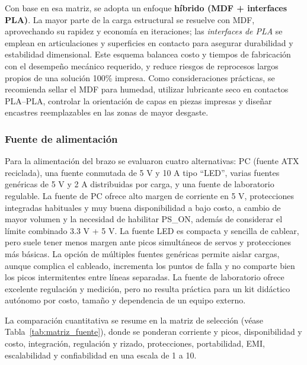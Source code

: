 Con base en esa matriz, se adopta un enfoque \textbf{híbrido (MDF + interfaces PLA)}. La mayor parte de la carga estructural se resuelve con MDF, aprovechando su rapidez y economía en iteraciones; las \emph{interfaces de PLA} se emplean en articulaciones y superficies en contacto para asegurar durabilidad y estabilidad dimensional. Este esquema balancea costo y tiempos de fabricación con el desempeño mecánico requerido, y reduce riesgos de reprocesos largos propios de una solución 100\% impresa. Como consideraciones prácticas, se recomienda sellar el MDF para humedad, utilizar lubricante seco en contactos PLA–PLA, controlar la orientación de capas en piezas impresas y diseñar encastres reemplazables en las zonas de mayor desgaste.


\subsubsection{Fuente de alimentación}

Para la alimentación del brazo se evaluaron cuatro alternativas: PC (fuente ATX reciclada), una fuente conmutada de 5 V y 10 A tipo ``LED'', varias fuentes genéricas de 5 V y 2 A distribuidas por carga, y una fuente de laboratorio regulable. La fuente de PC ofrece alto margen de corriente en 5 V, protecciones integradas habituales y muy buena disponibilidad a bajo costo, a cambio de mayor volumen y la necesidad de habilitar PS\_ON, además de considerar el límite combinado 3.3 V + 5 V. La fuente LED es compacta y sencilla de cablear, pero suele tener menos margen ante picos simultáneos de servos y protecciones más básicas. La opción de múltiples fuentes genéricas permite aislar cargas, aunque complica el cableado, incrementa los puntos de falla y no comparte bien los picos intermitentes entre líneas separadas. La fuente de laboratorio ofrece excelente regulación y medición, pero no resulta práctica para un kit didáctico autónomo por costo, tamaño y dependencia de un equipo externo.

\vspace{1em}

La comparación cuantitativa se resume en la matriz de selección (véase Tabla~\ref{tab:matriz_fuente}), donde se ponderan corriente y picos, disponibilidad y costo, integración, regulación y rizado, protecciones, portabilidad, EMI, escalabilidad y confiabilidad en una escala de 1 a 10.


